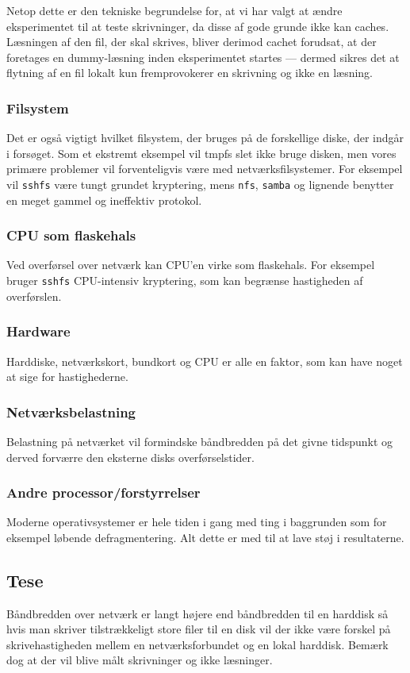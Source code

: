 \documentclass{article}
\begin{document}
Netop dette er den tekniske begrundelse for, at vi har valgt at ændre eksperimentet til at teste skrivninger, da disse af gode grunde ikke kan caches. Læsningen af den fil, der skal skrives, bliver derimod cachet forudsat, at der foretages en dummy-læsning inden eksperimentet startes --- dermed sikres det at flytning af en fil lokalt kun fremprovokerer en skrivning og ikke en læsning.

\subsubsection{Filsystem}
Det er også vigtigt hvilket filsystem, der bruges på de forskellige diske, der indgår i forsøget. Som et ekstremt eksempel vil tmpfs slet ikke bruge disken, men vores primære problemer vil forventeligvis være med netværksfilsystemer. For eksempel vil {\tt sshfs} være tungt grundet kryptering, mens {\tt nfs}, {\tt samba} og lignende benytter en meget gammel og ineffektiv protokol.

\subsubsection{CPU som flaskehals}
Ved overførsel over netværk kan CPU'en virke som flaskehals. For eksempel bruger {\tt sshfs} CPU-intensiv kryptering, som kan begrænse hastigheden af overførslen.

\subsubsection{Hardware}
Harddiske, netværkskort, bundkort og CPU er alle en faktor, som kan have noget at sige for hastighederne.

\subsubsection{Netværksbelastning}
Belastning på netværket vil formindske båndbredden på det givne tidspunkt og derved forværre den eksterne disks overførselstider.

\subsubsection{Andre processor/forstyrrelser}
Moderne operativsystemer er hele tiden i gang med ting i baggrunden som for eksempel løbende defragmentering. Alt dette er med til at lave støj i resultaterne.

\subsection{Tese}
Båndbredden over netværk er langt højere end båndbredden til en harddisk så hvis man skriver tilstrækkeligt store filer til en disk vil der ikke være forskel på skrivehastigheden mellem en netværksforbundet og en lokal harddisk. Bemærk dog at der vil blive målt skrivninger og ikke læsninger.
\end{document}
